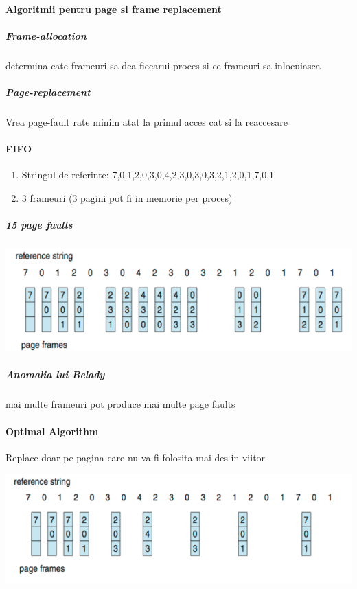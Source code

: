 \documentclass{article}
\begin{document}
\paragraph*{Algoritmii pentru page si frame replacement}
\subparagraph*{Frame-allocation} determina cate frameuri sa dea fiecarui proces si ce frameuri sa inlocuiasca
\subparagraph*{Page-replacement} Vrea page-fault rate minim atat la primul acces cat si la reaccesare

\paragraph*{FIFO}
\begin{enumerate}
    \item Stringul de referinte: 7,0,1,2,0,3,0,4,2,3,0,3,0,3,2,1,2,0,1,7,0,1
    \item 3 frameuri (3 pagini pot fi in memorie per proces)
\end{enumerate}

\subparagraph*{15 page faults}
\begin{center}
    \includegraphics[scale=0.4]{34-fifopf.png}
\end{center}
\subparagraph*{Anomalia lui Belady} mai multe frameuri pot produce mai multe page faults

\paragraph*{Optimal Algorithm} Replace doar pe pagina care nu va fi folosita mai des in viitor
\begin{center}
    \includegraphics[scale=0.4]{35-optpf.png}
\end{center}
\end{document}
